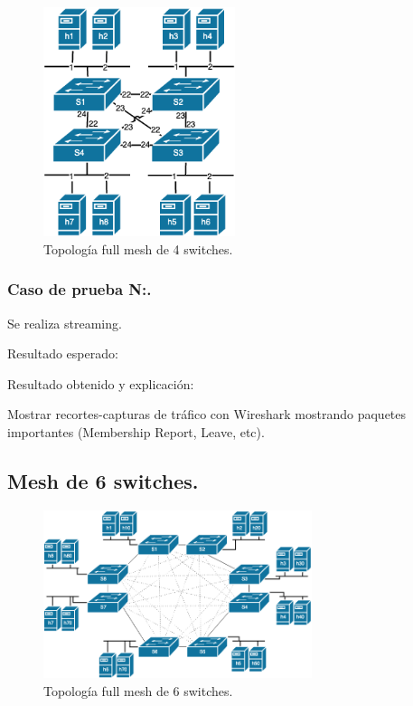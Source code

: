 \documentclass[12pt,a4paper,oneside]{book}
\begin{document}
\begin{figure}[ht]
 \centering
 \includegraphics[width=0.5\textwidth]{fotos/5_Pruebas/4_topo_mesh/mesh_simple.png}
 \caption{Topología full mesh de 4 switches.}
 \label{mesh_simple}
\end{figure}

\subsubsection{Caso de prueba N:.} 
Se realiza streaming.

\vspace{0.5cm}
Resultado esperado: 

\vspace{0.5cm}
Resultado obtenido y explicación: 

\vspace{0.5cm}
Mostrar recortes-capturas de tráfico con Wireshark mostrando paquetes importantes (Membership Report, Leave, etc).

\subsection{Mesh de 6 switches.}

\begin{figure}[ht]
 \centering
 \includegraphics[width=0.7\textwidth]{fotos/5_Pruebas/4_topo_mesh/mesh_compleja.png}
 \caption{Topología full mesh de 6 switches.}
 \label{mesh_compleja}
\end{figure}
\end{document}
